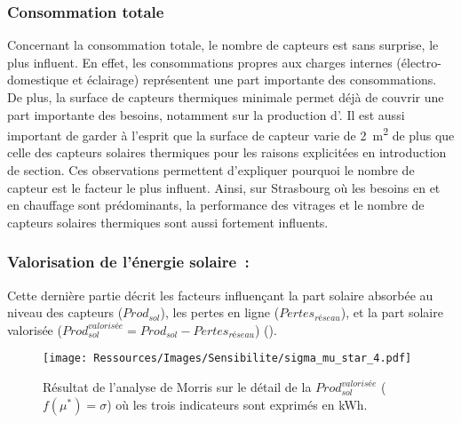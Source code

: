 \subsubsection{Consommation totale} %
\label{ssub:consommation_totale}
Concernant la consommation totale, le nombre de capteurs  est sans surprise, le
plus influent. En effet, les consommations propres aux charges internes (électro-domestique
et éclairage) représentent une part importante des consommations. De plus, la
surface de capteurs thermiques minimale permet déjà de couvrir une part importante des
besoins, notamment sur la production d’. Il est aussi important de garder à
l’esprit que la surface de capteur  varie de \SI{2}{\metre\squared} de plus que
celle des capteurs solaires thermiques pour les raisons explicitées en introduction de
section. Ces observations permettent d’expliquer pourquoi le nombre de capteur 
est le facteur le plus influent. Ainsi, sur Strasbourg où les besoins en  et
en chauffage sont prédominants, la performance des vitrages et le nombre de capteurs
solaires thermiques sont aussi fortement influents.


\subsubsection{Valorisation de l’énergie solaire~:} %
\label{ssub:valorisation_de_l_energie_solaire}
Cette dernière partie décrit les facteurs influençant la part solaire absorbée au niveau
des capteurs ($Prod_{sol}$), les pertes en ligne ($Pertes_{réseau}$), et la part solaire
valorisée ($Prod_{sol}^{valorisée} = Prod_{sol} - Pertes_{réseau}$) ().

\begin{figure}
    \centering
    \texttt{[image: Ressources/Images/Sensibilite/sigma\_mu\_star\_4.pdf]}
    \caption[Résultat de l’analyse de Morris sur le détail de la
             $Prod_{sol}^{valorisée}$ ($f(\mu^{*}) = \sigma$)]
            {Résultat de l’analyse de Morris sur le détail de la
             $Prod_{sol}^{valorisée}$ ($f(\mu^{*}) = \sigma$) où les trois indicateurs sont exprimés
             en \si{kWh}.}
    \label{fig:prod_sol_valorisee_mu_star}
\end{figure}

